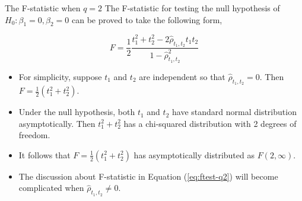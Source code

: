 \documentclass[presentation,10pt]{beamer}
\begin{document}
\begin{frame}[label={sec:org14e6596}]{The F-statistic when \(q=2\)}
The F-statistic for testing the null hypothesis of \(H_0: \beta_1 = 0,
\beta_2 = 0\) can be proved to take the following form,

\begin{equation}
\label{eq:ftest-q2}
F = \frac{1}{2}\frac{t_1^2 + t_2^2 - 2 \hat{\rho}_{t_1,t_2}t_1t_2}{1 - \hat{\rho}_{t_1,t_2}^2}
\end{equation}

\begin{itemize}
\item For simplicity, suppose \(t_1\) and \(t_2\) are independent so that
\(\hat{\rho}_{t_1,t_2} = 0\). Then \(F = \frac{1}{2}(t_1^2 +
  t_2^2)\).
\item Under the null hypothesis, both \(t_1\) and \(t_2\) have standard normal
distribution asymptotically. Then \(t^2_1 + t^2_2\) has a chi-squared
distribution with 2 degrees of freedom.
\item It follows that \(F = \frac{1}{2}(t^2_1 + t^2_2)\) has asymptotically
distributed as \(F(2, \infty)\).
\item The discussion about F-statistic in Equation (\ref{eq:ftest-q2})
will become complicated when \(\hat{\rho}_{t_1,t_2} \neq 0\).
\end{itemize}
\end{frame}
\end{document}
